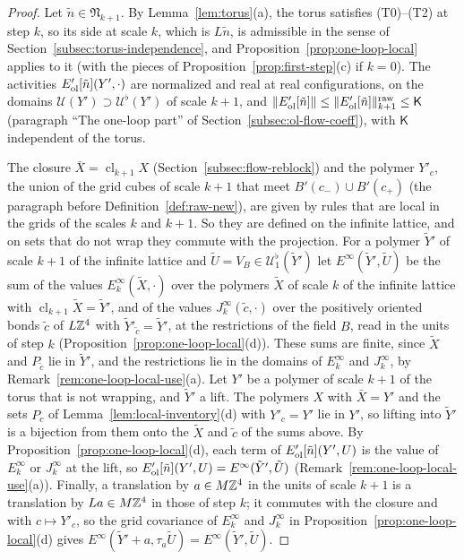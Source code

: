 \begin{proof}
Let $\tilde n\in\mathfrak N_{k+1}$. By Lemma~\ref{lem:torus}(a), the torus satisfies (T0)--(T2) at step $k$, so its side at scale $k$, which is $L\tilde n$, is admissible in the sense of Section~\ref{subsec:torus-independence}, and Proposition~\ref{prop:one-loop-local} applies to it (with the pieces of Proposition~\ref{prop:first-step}(c) if $k=0$). The activities $E'_{\rm ol}[\tilde n](Y',\cdot)$ are normalized and real at real configurations, on the domains $\mathcal U(Y')\supset\mathcal U^\flat(Y')$ of scale $k+1$, and $\|E'_{\rm ol}[\tilde n]\|\le\|E'_{\rm ol}[\tilde n]\|^{\rm raw}_{k+1}\le\mathsf K$ (paragraph ``The one-loop part'' of Section~\ref{subsec:ol-flow-coeff}), with $\mathsf K$ independent of the torus.

The closure $\bar X=\operatorname{cl}_{k+1}X$ (Section~\ref{subsec:flow-reblock}) and the polymer $Y'_c$, the union of the grid cubes of scale $k+1$ that meet $B'(c_-)\cup B'(c_+)$ (the paragraph before Definition~\ref{def:raw-new}), are given by rules that are local in the grids of the scales $k$ and $k+1$. So they are defined on the infinite lattice, and on sets that do not wrap they commute with the projection. For a polymer $\tilde Y'$ of scale $k+1$ of the infinite lattice and $\tilde U=V_B\in\mathcal U^\flat_1(\tilde Y')$ let $E^\infty(\tilde Y',\tilde U)$ be the sum of the values $E^\infty_k(\tilde X,\cdot)$ over the polymers $\tilde X$ of scale $k$ of the infinite lattice with $\operatorname{cl}_{k+1}\tilde X=\tilde Y'$, and of the values $J^\infty_k(\tilde c,\cdot)$ over the positively oriented bonds $\tilde c$ of $L\mathbb Z^4$ with $\tilde Y'_{\tilde c}=\tilde Y'$, at the restrictions of the field $B$, read in the units of step $k$ (Proposition~\ref{prop:one-loop-local}(d)). These sums are finite, since $\tilde X$ and $P_{\tilde c}$ lie in $\tilde Y'$, and the restrictions lie in the domains of $E^\infty_k$ and $J^\infty_k$, by Remark~\ref{rem:one-loop-local-use}(a). Let $Y'$ be a polymer of scale $k+1$ of the torus that is not wrapping, and $\tilde Y'$ a lift. The polymers $X$ with $\bar X=Y'$ and the sets $P_c$ of Lemma~\ref{lem:local-inventory}(d) with $Y'_c=Y'$ lie in $Y'$, so lifting into $\tilde Y'$ is a bijection from them onto the $\tilde X$ and $\tilde c$ of the sums above. By Proposition~\ref{prop:one-loop-local}(d), each term of $E'_{\rm ol}[\tilde n](Y',U)$ is the value of $E^\infty_k$ or $J^\infty_k$ at the lift, so $E'_{\rm ol}[\tilde n](Y',U)=E^\infty(\tilde Y',\tilde U)$ (Remark~\ref{rem:one-loop-local-use}(a)). Finally, a translation by $a\in M\mathbb Z^4$ in the units of scale $k+1$ is a translation by $La\in M\mathbb Z^4$ in those of step $k$; it commutes with the closure and with $c\mapsto Y'_c$, so the grid covariance of $E^\infty_k$ and $J^\infty_k$ in Proposition~\ref{prop:one-loop-local}(d) gives $E^\infty(\tilde Y'+a,\tau_a\tilde U)=E^\infty(\tilde Y',\tilde U)$.
\end{proof}

